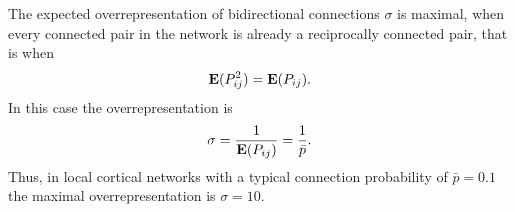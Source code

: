 
The expected overrepresentation of bidirectional connections $\sigma$ is maximal, when every connected pair in the network is already a reciprocally connected pair, that is when
\[
\operatorname{\mathbf{E}}(P_{ij}^2) = \operatorname{\mathbf{E}}(P_{ij}).
\]
%
In this case the overrepresentation is
\[
\sigma = \frac{1}{\operatorname{\mathbf{E}}(P_{ij})} = \frac{1}{\bar{p}}.
\]
Thus, in local cortical networks with a typical connection probability of $\bar{p} = 0.1$ the maximal overrepresentation is $\sigma = 10$.
